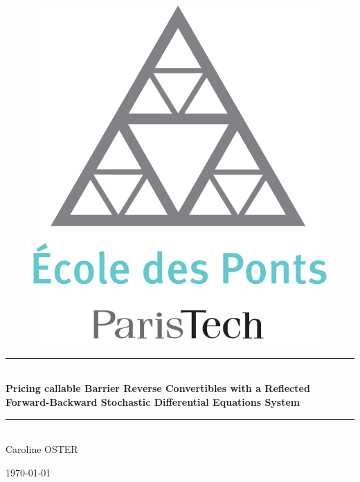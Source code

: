 \documentclass[a4paper,11pt,english]{book}
\begin{document}

\frontmatter
\begin{titlepage}
\begin{center}
\begin{figure}[H] 
    \centering
    \includegraphics[scale=0.2]{images/Logo_ponts_paristech.png} 
    \vspace{4ex}
\end{figure}
\rule{\linewidth}{0.5mm} \\[0.4cm]
{ \LARGE \bfseries Pricing callable Barrier Reverse Convertibles with a Reflected Forward-Backward Stochastic Differential Equations System \\
}
\rule{\linewidth}{0.5mm} \\[1cm]


Caroline \textsc{OSTER}

\noindent

\vspace{4cm}

{\today}
\end{center}
\end{titlepage}
\newpage
\end{document}

